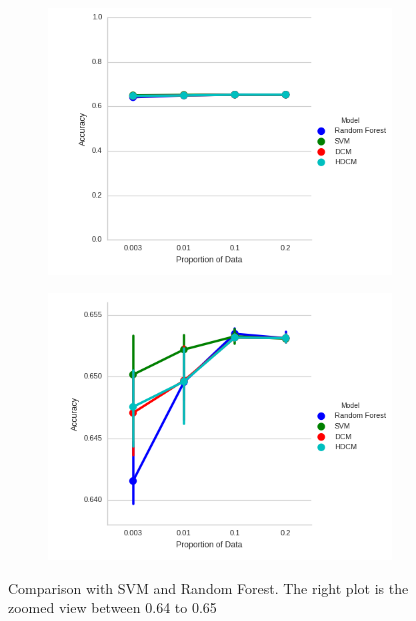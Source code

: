 \begin{figure}
    \centering
    \begin{subfigure}[b]{0.44\textwidth}
        \includegraphics[width=\textwidth]{images/svm_vs_HDCM.png}
    \end{subfigure}
    \begin{subfigure}[b]{0.44\textwidth}
        \includegraphics[width=\textwidth]{images/svm_vs_HDCM_zoomed.png}       
    \end{subfigure}
    
    \caption[Comparison with SVM and Random Forest]{ Comparison with SVM and Random Forest. The right plot is the zoomed view between 0.64 to 0.65}
    \label{fig:SVM_vs_DCM}
\end{figure}

